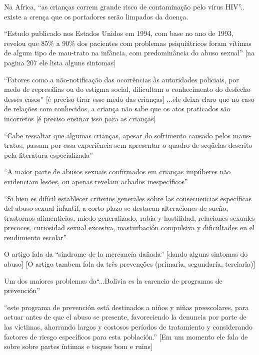 Na Africa, ``as crianças correm grande risco de contaminação pelo vírus HIV''.. existe a crença que os portadores serão limpados da doença. \cite{aded2006abuso}

``Estudo publicado nos Estados Unidos em 1994, com base no ano de 1993, revelou que 85\% a 90\% dos pacientes com problemas psiquiátricos foram vítimas de algum tipo de mau-trato na infância, com predominância do abuso sexual''\cite{aded2006abuso} [na pagina 207 ele lista alguns sintomas]

``Fatores como a não-notificação das ocorrências às autoridades policiais, por medo de represálias ou do estigma social, dificultam o conhecimento do desfecho desses casos'' [é preciso tirar esse medo das crianças] \cite{aded2006abuso} ...ele deixa claro que no caso de relações com conhecidos, a criança não sabe que os atos praticados são incorretos [é preciso ensinar isso para as crianças]

``Cabe ressaltar que algumas crianças, apesar do sofrimento causado pelos maus-tratos, passam por essa experiência sem apresentar o quadro de seqüelas descrito pela literatura especializada'' \cite{aded2006abuso} 

``A maior parte de abusos sexuais confirmados em crianças impúberes não evidenciam lesões, ou apenas revelam achados inespecíficos''\cite{aded2006abuso} 


``Si bien es difícil establecer criterios generales sobre las consecuencias específicas del abuso sexual infantil, a corto plazo se destacan alteraciones de sueño, trastornos alimenticios, miedo generalizado, rabia y hostilidad, relaciones sexuales precoces, curiosidad sexual excesiva, masturbación compulsiva y dificultades en el rendimiento escolar'' \cite{mariscal2003programa}

O artigo fala da ``síndrome de la mercancía dañada'' [dando alguns sintomas do abuso] [O artigo tambem fala da três prevenções (primaria, segundaria, terciaria)] \cite{mariscal2003programa}

Um dos maiores problemas da``...Bolivia es la carencia de programas de prevención'' \cite{mariscal2003programa}


``este programa de prevención está destinados a niños y niñas preescolares, para actuar antes de que el abuso se presente, favoreciendo la denuncia por parte de las víctimas, ahorrando largos y costosos períodos de tratamiento y considerando factores de riesgo específicos para esta población.'' [Em um momento ele fala de sobre sobre partes íntimas e toques bom e ruins] \cite{mariscal2003programa}

